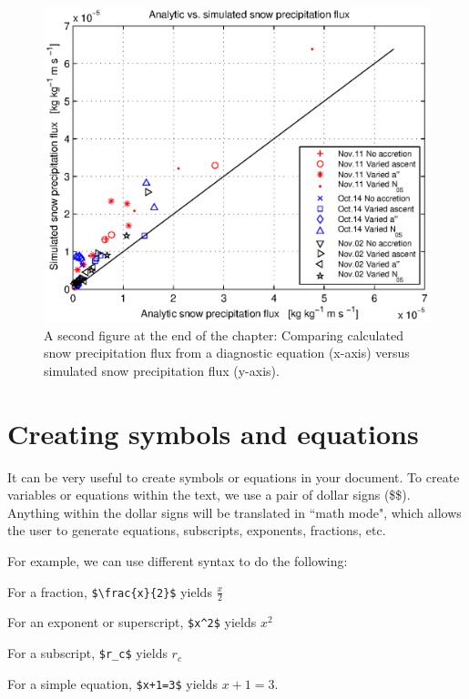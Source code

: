 \documentclass[master]{UWMThesis}
\begin{document}
\begin{figure}[h]
 \centering
 \noindent\includegraphics[width=35pc]{./figures/scatter_eqn23_F_psdep.eps}
 \caption{A second figure at the end of the chapter: Comparing calculated snow precipitation flux from a diagnostic equation (x-axis) versus simulated snow precipitation flux (y-axis).} 
                             \label{fig:scatter_F_psdep}
\end{figure}


\chapter{Creating symbols and equations}  \label{sec:equations}

It can be very useful to create symbols or equations in your document.  To create variables or equations within the text, we use a pair of dollar signs (\$\$).  Anything within the dollar signs will be translated in ``math mode", which allows the user to generate equations, subscripts, exponents, fractions, etc.

For example, we can use different syntax to do the following:

\begin{center}
For a fraction, \verb=$\frac{x}{2}$= yields $\frac{x}{2}$

For an exponent or superscript, \verb=$x^2$= yields $x^2$

For a subscript, \verb=$r_c$= yields $r_c$

For a simple equation, \verb|$x+1=3$| yields $x+1=3$.
\end{center}
\end{document}
